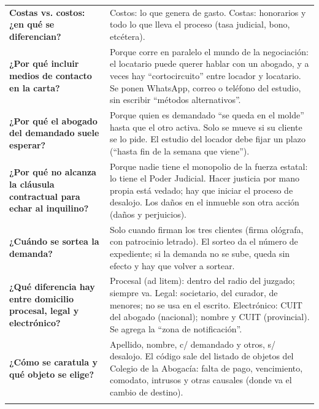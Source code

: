\documentclass[12pt,oneside]{book}
\begin{document}
\begin{longtable}{>{\RaggedRight\arraybackslash}p{} >{\RaggedRight\arraybackslash}p{}}
\textbf{Costas vs. costos: ¿en qué se diferencian?} &
Costos: lo que genera de gasto. Costas: honorarios y todo lo que lleva el proceso (tasa judicial, bono, etcétera). \\
\addlinespace \cmidrule{1-2}

\textbf{¿Por qué incluir medios de contacto en la carta?} &
Porque corre en paralelo el mundo de la negociación: el locatario puede querer hablar con un abogado, y a veces hay ``cortocircuito'' entre locador y locatario. Se ponen WhatsApp, correo o teléfono del estudio, sin escribir ``métodos alternativos''. \\
\addlinespace \cmidrule{1-2}

\textbf{¿Por qué el abogado del demandado suele esperar?} &
Porque quien es demandado ``se queda en el molde'' hasta que el otro activa. Solo se mueve si su cliente se lo pide. El estudio del locador debe fijar un plazo (``hasta fin de la semana que viene''). \\
\addlinespace \cmidrule{1-2}

\textbf{¿Por qué no alcanza la cláusula contractual para echar al inquilino?} &
Porque nadie tiene el monopolio de la fuerza estatal: lo tiene el Poder Judicial. Hacer justicia por mano propia está vedado; hay que iniciar el proceso de desalojo. Los daños en el inmueble son otra acción (daños y perjuicios). \\
\addlinespace \cmidrule{1-2}

\textbf{¿Cuándo se sortea la demanda?} &
Solo cuando firman los tres clientes (firma ológrafa, con patrocinio letrado). El sorteo da el número de expediente; si la demanda no se sube, queda sin efecto y hay que volver a sortear. \\
\addlinespace \cmidrule{1-2}

\textbf{¿Qué diferencia hay entre domicilio procesal, legal y electrónico?} &
Procesal (ad litem): dentro del radio del juzgado; siempre va. Legal: societario, del curador, de menores; no se usa en el escrito. Electrónico: CUIT del abogado (nacional); nombre y CUIT (provincial). Se agrega la ``zona de notificación''. \\
\addlinespace \cmidrule{1-2}

\textbf{¿Cómo se caratula y qué objeto se elige?} &
Apellido, nombre, c/ demandado y otros, s/ desalojo. El código sale del listado de objetos del Colegio de la Abogacía: falta de pago, vencimiento, comodato, intrusos y otras causales (donde va el cambio de destino). \\
\addlinespace \cmidrule{1-2}


\end{longtable}
\end{document}
